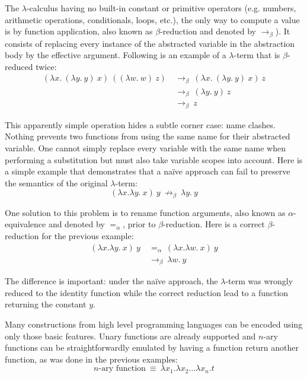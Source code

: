 The $\lambda$-calculus having no built-in constant or primitive operators (e.g. numbers, arithmetic
operations, conditionals, loops, etc.), the only way to compute a value is by function application,
also known as $\beta$-reduction and denoted by $\to_\beta$). It consists of replacing every instance
of the abstracted variable in the abstraction body by the effective argument. Following is an
example of a $\lambda$-term that is $\beta$-reduced twice:
\begin{align*}
  (\lambda x. \ (\lambda y. \ y) \ x) \ ((\lambda w. \ w) \ z)
    & \: \to_\beta \: (\lambda x. \ (\lambda y. \ y) \ x) \ z \\
    & \: \to_\beta \: (\lambda y. \ y) \ z \\
    & \: \to_\beta \: z
\end{align*}

This apparently simple operation hides a subtle corner case: name clashes. Nothing prevents two
functions from using the same name for their abstracted variable. One cannot simply replace every
variable with the same name when performing a substitution but must also take variable scopes into
account. Here is a simple example that demonstrates that a naïve approach can fail to preserve the
semantics of the original $\lambda$-term:
\begin{displaymath}
  (\lambda x. \lambda y. \ x) \ y \: \not\to_\beta \: \lambda y. \ y
\end{displaymath}

One solution to this problem is to rename function arguments, also known as $\alpha$-equivalence and
denoted by $=_\alpha$, prior to $\beta$-reduction. Here is a correct $\beta$-reduction for the
previous example:
\begin{align*}
  (\lambda x. \lambda y. \ x) \ y
    & \: =_\alpha \: (\lambda x. \lambda w. \ x) \ y \\
    & \: \to_\beta \: \lambda w. \ y
\end{align*}

The difference is important: under the naïve approach, the $\lambda$-term was wrongly reduced to the
identity function while the correct reduction lead to a function returning the constant $y$.

Many constructions from high level programming languages can be encoded using only those basic
features. Unary functions are already supported and $n$-ary functions can be straightforwardly
emulated by having a function return another function, as was done in the previous examples:
\begin{displaymath}
  n\text{-ary function} \: \equiv \: \lambda x_1. \lambda x_2 \dots \lambda x_n. t
\end{displaymath}


